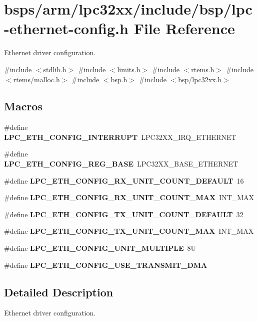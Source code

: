 \hypertarget{lpc32xx_2include_2bsp_2lpc-ethernet-config_8h}{}\section{bsps/arm/lpc32xx/include/bsp/lpc-\/ethernet-\/config.h File Reference}
\label{lpc32xx_2include_2bsp_2lpc-ethernet-config_8h}


Ethernet driver configuration.  


{\ttfamily \#include $<$stdlib.\+h$>$}\newline
{\ttfamily \#include $<$limits.\+h$>$}\newline
{\ttfamily \#include $<$rtems.\+h$>$}\newline
{\ttfamily \#include $<$rtems/malloc.\+h$>$}\newline
{\ttfamily \#include $<$bsp.\+h$>$}\newline
{\ttfamily \#include $<$bsp/lpc32xx.\+h$>$}\newline
\subsection*{Macros}
\begin{DoxyCompactItemize}
\item 
\#define {\bfseries L\+P\+C\+\_\+\+E\+T\+H\+\_\+\+C\+O\+N\+F\+I\+G\+\_\+\+I\+N\+T\+E\+R\+R\+U\+PT}~L\+P\+C32\+X\+X\+\_\+\+I\+R\+Q\+\_\+\+E\+T\+H\+E\+R\+N\+ET
\item 
\#define {\bfseries L\+P\+C\+\_\+\+E\+T\+H\+\_\+\+C\+O\+N\+F\+I\+G\+\_\+\+R\+E\+G\+\_\+\+B\+A\+SE}~L\+P\+C32\+X\+X\+\_\+\+B\+A\+S\+E\+\_\+\+E\+T\+H\+E\+R\+N\+ET
\item 
\#define {\bfseries L\+P\+C\+\_\+\+E\+T\+H\+\_\+\+C\+O\+N\+F\+I\+G\+\_\+\+R\+X\+\_\+\+U\+N\+I\+T\+\_\+\+C\+O\+U\+N\+T\+\_\+\+D\+E\+F\+A\+U\+LT}~16
\item 
\#define {\bfseries L\+P\+C\+\_\+\+E\+T\+H\+\_\+\+C\+O\+N\+F\+I\+G\+\_\+\+R\+X\+\_\+\+U\+N\+I\+T\+\_\+\+C\+O\+U\+N\+T\+\_\+\+M\+AX}~I\+N\+T\+\_\+\+M\+AX
\item 
\#define {\bfseries L\+P\+C\+\_\+\+E\+T\+H\+\_\+\+C\+O\+N\+F\+I\+G\+\_\+\+T\+X\+\_\+\+U\+N\+I\+T\+\_\+\+C\+O\+U\+N\+T\+\_\+\+D\+E\+F\+A\+U\+LT}~32
\item 
\#define {\bfseries L\+P\+C\+\_\+\+E\+T\+H\+\_\+\+C\+O\+N\+F\+I\+G\+\_\+\+T\+X\+\_\+\+U\+N\+I\+T\+\_\+\+C\+O\+U\+N\+T\+\_\+\+M\+AX}~I\+N\+T\+\_\+\+M\+AX
\item 
\#define {\bfseries L\+P\+C\+\_\+\+E\+T\+H\+\_\+\+C\+O\+N\+F\+I\+G\+\_\+\+U\+N\+I\+T\+\_\+\+M\+U\+L\+T\+I\+P\+LE}~8U
\item 
\#define {\bfseries L\+P\+C\+\_\+\+E\+T\+H\+\_\+\+C\+O\+N\+F\+I\+G\+\_\+\+U\+S\+E\+\_\+\+T\+R\+A\+N\+S\+M\+I\+T\+\_\+\+D\+MA}
\end{DoxyCompactItemize}


\subsection{Detailed Description}
Ethernet driver configuration. 

